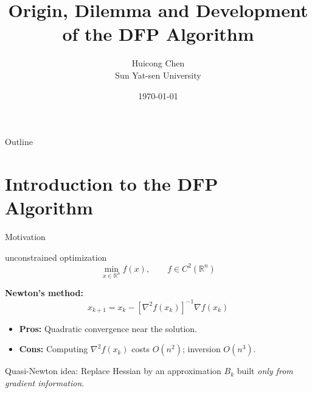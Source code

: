 \documentclass[aspectratio=169]{beamer}
\title{Origin, Dilemma and Development of the DFP Algorithm}
\author{Huicong Chen\\
Sun Yat-sen University}
\date{\today}
\newcommand{\RR}{\mathbb{R}}
\begin{document}
	
	\begin{frame}
		\titlepage
	\end{frame}
	
	\begin{frame}{Outline}
		\tableofcontents
	\end{frame}
	
	\section{Introduction to the DFP Algorithm}
	
	\begin{frame}{Motivation}
		\begin{block}{unconstrained optimization}
			\[
			\min_{x\in\RR^n} f(x), \qquad f\in C^2(\RR^n)
			\]
		\end{block}
		
		\textbf{Newton's method:}
		\[
		x_{k+1}=x_k-[\nabla^2 f(x_k)]^{-1}\nabla f(x_k)
		\]
		\begin{itemize}
			\item \textbf{Pros:} Quadratic convergence near the solution.
			\item \textbf{Cons:} Computing $\nabla^2 f(x_k)$ costs $O(n^2)$; inversion $O(n^3)$.
		\end{itemize}
		
		Quasi-Newton idea: Replace Hessian by an approximation $B_k$ built \emph{only from gradient information}.
	\end{frame}
	
\end{document}

